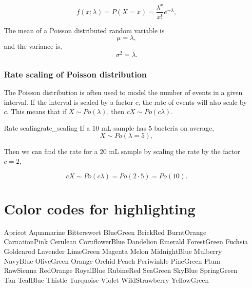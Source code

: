 \begin{equation}
f(x;\lambda) = P(X=x) = \frac{\lambda^x}{x!} e^{-\lambda},
\end{equation}

The mean of a Poisson distributed random variable is
\begin{equation}
\mu = \lambda,
\end{equation}
and the variance is,
\begin{equation}
\sigma^2 = \lambda.
\end{equation}

\subsubsection{Rate scaling of Poisson distribution}

The Poisson distribution is often used to model the number of events in a given interval. If the interval is scaled by a factor $c$, the rate of events will also scale by $c$. This means that if $X \sim Po(\lambda)$, then $cX \sim Po(c\lambda)$.

\begin{example}{Rate scaling}{rate_scaling}
If a 10 mL sample has 5 bacteria on average,
\begin{equation*}
X \sim Po(\lambda = 5),
\end{equation*}

Then we can find the rate for a 20 mL sample by scaling the rate by the factor $c = 2$,

\begin{equation*}
cX \sim Po(c\lambda) = Po(2 \cdot 5) = Po(10).
\end{equation*}
\end{example}

\section{Color codes for highlighting}
Apricot
Aquamarine
Bittersweet
BlueGreen
BrickRed
BurntOrange
CarnationPink
Cerulean
CornflowerBlue
Dandelion
Emerald
ForestGreen
Fuchsia
Goldenrod
Lavender
LimeGreen
Magenta
Melon
MidnightBlue
Mulberry
NavyBlue
OliveGreen
Orange
Orchid
Peach
Periwinkle
PineGreen
Plum
RawSienna
RedOrange
RoyalBlue
RubineRed
SeaGreen
SkyBlue
SpringGreen
Tan
TealBlue
Thistle
Turquoise
Violet
WildStrawberry
YellowGreen

